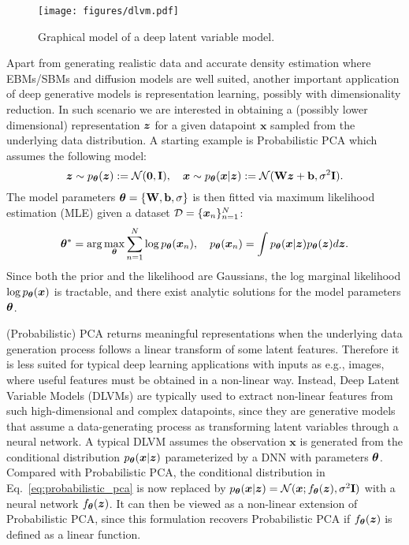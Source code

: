 \begin{figure}[t]
    \centering
\texttt{[image: figures/dlvm.pdf]}
    \vspace{-1.5em}
    \caption{Graphical model of a deep latent variable model.}
    \label{fig: dlvm}
\end{figure}

Apart from generating realistic data and accurate density estimation where EBMs/SBMs and diffusion models are well suited, another important application of deep generative models is representation learning, possibly with dimensionality reduction. In such scenario we are interested in obtaining a (possibly lower dimensional) representation $\bm{z}$ for a given datapoint $\bm{x}$ sampled from the underlying data distribution. A starting example is Probabilistic PCA \citep{tipping1999probabilistic} which assumes the following model:
\begin{equation}
\bm{z} \sim p_{\bm{\theta}}(\bm{z}) := \mathcal{N}(\bm{0}, \mathbf{I}), \quad \bm{x} \sim p_{\bm{\theta}}(\bm{x} | \bm{z}) := \mathcal{N}(\mathbf{W} \bm{z} + \mathbf{b}, \sigma^2 \mathbf{I}).
\label{eq:probabilistic_pca}
\end{equation}
%
The model parameters $\bm{\theta} = \{ \mathbf{W}, \mathbf{b}, \sigma \}$ is then fitted via maximum likelihood estimation (MLE) given a dataset $\mathcal{D}=\{\bm{x}_n\}_{n=1}^N$:
\begin{equation}
    \bm{\theta}^* = \arg\max_{\bm{\theta}} \sum_{n=1}^N \log p_{\bm{\theta}}(\bm{x}_n), \quad p_{\bm{\theta}}(\bm{x}_n) = \int p_{\bm{\theta}}(\bm{x} | \bm{z}) p_{\bm{\theta}}(\bm{z}) d\bm{z}.
    \label{eq:dlvm_mle}
\end{equation}
Since both the prior and the likelihood are Gaussians, the log marginal likelihood $\log p_{\bm{\theta}}(\bm{x})$ is tractable, and there exist analytic solutions for the model parameters $\bm{\theta}$.

(Probabilistic) PCA returns meaningful representations when the underlying data generation process follows a linear transform of some latent features. Therefore it is less suited for typical deep learning applications with inputs as e.g., images, where useful features must be obtained in a non-linear way.
%
Instead, Deep Latent Variable Models (DLVMs) \citep{welling2014auto,rezende:vae2014} are typically used to extract non-linear features from such high-dimensional and complex datapoints, since they are generative models that assume a data-generating process as transforming latent variables through a neural network. A typical DLVM assumes the observation $\bm{x}$ is generated from the conditional distribution $p_{\bm{\theta}}(\bm{x}|\bm{z})$ parameterized by a DNN with parameters $\bm{\theta}$. Compared with Probabilistic PCA, the conditional distribution in Eq.~\eqref{eq:probabilistic_pca} is now replaced by $p_{\bm{\theta}}(\bm{x} | \bm{z}) = \mathcal{N}(\bm{x}; f_{\bm{\theta}}(\bm{z}), \sigma^2 \mathbf{I})$ with a neural network $f_{\bm{\theta}}(\bm{z})$. It can then be viewed as a non-linear extension of Probabilistic PCA, since this formulation recovers Probabilistic PCA if $f_{\bm{\theta}}(\bm{z})$ is defined as a linear function.
%

